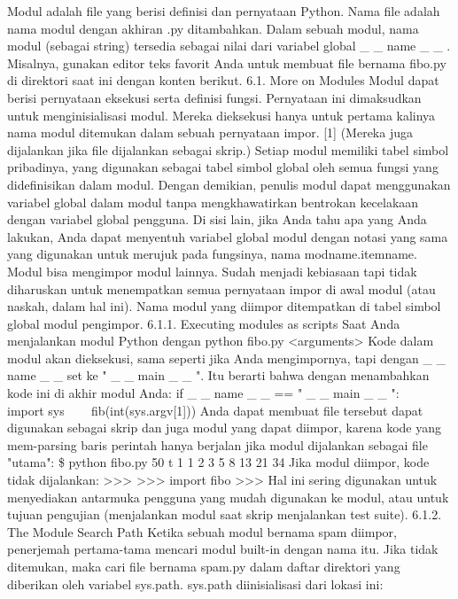 Modul adalah file yang berisi definisi dan pernyataan Python. Nama file adalah nama modul dengan akhiran .py ditambahkan. Dalam sebuah modul, nama modul (sebagai string) tersedia sebagai nilai dari variabel global    \_     \_  name   \_     \_  . Misalnya, gunakan editor teks favorit Anda untuk membuat file bernama fibo.py di direktori saat ini dengan konten berikut.  
6.1. More on Modules 
Modul dapat berisi pernyataan eksekusi serta definisi fungsi. Pernyataan ini dimaksudkan untuk menginisialisasi modul. Mereka dieksekusi hanya untuk pertama kalinya nama modul ditemukan dalam sebuah pernyataan impor. [1] (Mereka juga dijalankan jika file dijalankan sebagai skrip.)  
Setiap modul memiliki tabel simbol pribadinya, yang digunakan sebagai tabel simbol global oleh semua fungsi yang didefinisikan dalam modul. Dengan demikian, penulis modul dapat menggunakan variabel global dalam modul tanpa mengkhawatirkan bentrokan kecelakaan dengan variabel global pengguna. Di sisi lain, jika Anda tahu apa yang Anda lakukan, Anda dapat menyentuh variabel global modul dengan notasi yang sama yang digunakan untuk merujuk pada fungsinya, nama modname.itemname. 
Modul bisa mengimpor modul lainnya. Sudah menjadi kebiasaan tapi tidak diharuskan untuk menempatkan semua pernyataan impor di awal modul (atau naskah, dalam hal ini). Nama modul yang diimpor ditempatkan di tabel simbol global modul pengimpor.  
6.1.1. Executing modules as scripts  
Saat Anda menjalankan modul Python dengan  
python fibo.py <arguments>  
Kode dalam modul akan dieksekusi, sama seperti jika Anda mengimpornya, tapi dengan    \_     \_  name   \_     \_   set ke "   \_     \_  main   \_     \_  ". Itu berarti bahwa dengan menambahkan kode ini di akhir modul Anda: 
if    \_     \_  name   \_     \_   == "   \_     \_  main   \_     \_  ":  
~~~ import sys 
~~~ fib(int(sys.argv[1])) 
Anda dapat membuat file tersebut dapat digunakan sebagai skrip dan juga modul yang dapat diimpor, karena kode yang mem-parsing baris perintah hanya berjalan jika modul dijalankan sebagai file "utama":  
   \$   python fibo.py 50 t 
1 1 2 3 5 8 13 21 34  
Jika modul diimpor, kode tidak dijalankan:  
>>>  
>>> import fibo  
>>>  
Hal ini sering digunakan untuk menyediakan antarmuka pengguna yang mudah digunakan ke modul, atau untuk tujuan pengujian (menjalankan modul saat skrip menjalankan test suite). 
6.1.2. The Module Search Path 
Ketika sebuah modul bernama spam diimpor, penerjemah pertama-tama mencari modul built-in dengan nama itu. Jika tidak ditemukan, maka cari file bernama spam.py dalam daftar direktori yang diberikan oleh variabel sys.path. sys.path diinisialisasi dari lokasi ini:  
